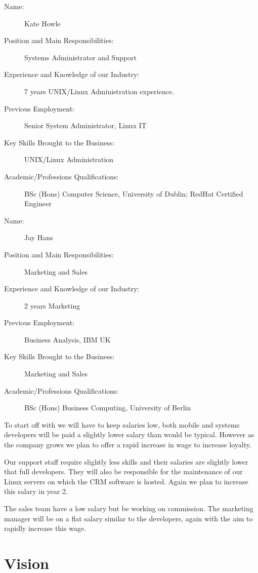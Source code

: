 \documentclass[DIV=calc, paper=a4, fontsize=11pt]{scrartcl}	 %
\begin{document}
\begin{description}
\item[Name:] Kate Howle
\item[Position and Main Responsibilities:] Systems Administrator and Support
\item[Experience and Knowledge of our Industry:] 7 years UNIX/Linux Administration experience.
\item[Previous Employment:] Senior System Administrator, Linux IT
\item[Key Skills Brought to the Business:] UNIX/Linux Administration
\item[Academic/Professions Qualifications:] BSc (Hons) Computer Science, University of Dublin; 
RedHat Certified Engineer
\end{description}

\begin{description}
\item[Name:] Jay Hans
\item[Position and Main Responsibilities:] Marketing and Sales
\item[Experience and Knowledge of our Industry:] 2 years Marketing
\item[Previous Employment:] Business Analysis, IBM UK
\item[Key Skills Brought to the Business:] Marketing and Sales
\item[Academic/Professions Qualifications:] BSc (Hons) Business Computing, University of Berlin
\end{description}

To start off with we will have to keep salaries low, both mobile and systems developers will be 
paid a slightly lower salary than would be typical. However as the company grows we plan to offer
a rapid increase in wage to increase loyalty.

Our support staff require slightly less skills and their salaries are slightly lower that full
developers. They will also be responsible for the maintenance of our Linux servers on which the 
CRM software is hosted. Again we plan to increase this salary in year 2.

The sales team have a low salary but be working on commission. The marketing manager will be on a
flat salary similar to the developers, again with the aim to rapidly increase this wage.

\section{Vision}
\end{document}
